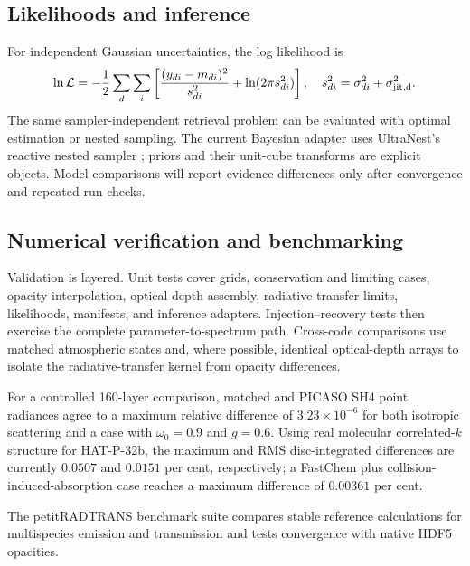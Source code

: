 \subsection{Likelihoods and inference}

For independent Gaussian uncertainties, the log likelihood is
\begin{equation}
 \ln \mathcal{L}=-\frac{1}{2}\sum_d\sum_i
 \left[\frac{(y_{di}-m_{di})^2}{s_{di}^2}
 +\ln(2\pi s_{di}^2)\right],
 \quad s_{di}^2=\sigma_{di}^2+\sigma_{\rm jit,d}^2.
 \label{eq:likelihood}
\end{equation}
The same sampler-independent retrieval problem can be evaluated with optimal
estimation \citep{Rodgers2000} or nested sampling. The current Bayesian adapter
uses UltraNest's reactive nested sampler \citep{Buchner2021}; priors and their
unit-cube transforms are explicit objects. Model comparisons will report
evidence differences only after convergence and repeated-run checks.

\subsection{Numerical verification and benchmarking}
\label{sec:benchmarks}

Validation is layered. Unit tests cover grids, conservation and limiting cases,
opacity interpolation, optical-depth assembly, radiative-transfer limits,
likelihoods, manifests, and inference adapters. Injection--recovery tests then
exercise the complete parameter-to-spectrum path. Cross-code comparisons use
matched atmospheric states and, where possible, identical optical-depth arrays
to isolate the radiative-transfer kernel from opacity differences.

For a controlled 160-layer comparison, matched \ROBERT{} and PICASO SH4 point
radiances agree to a maximum relative difference of $3.23\times10^{-6}$ for
both isotropic scattering and a case with $\omega_0=0.9$ and $g=0.6$. Using
real molecular correlated-$k$ structure for HAT-P-32b, the maximum and RMS
disc-integrated differences are currently $0.0507$ and $0.0151$ per cent,
respectively; a FastChem plus collision-induced-absorption case reaches a
maximum difference of $0.00361$ per cent. 

The petitRADTRANS benchmark suite compares stable reference calculations for
multispecies emission and transmission and tests convergence with native HDF5
opacities. 

